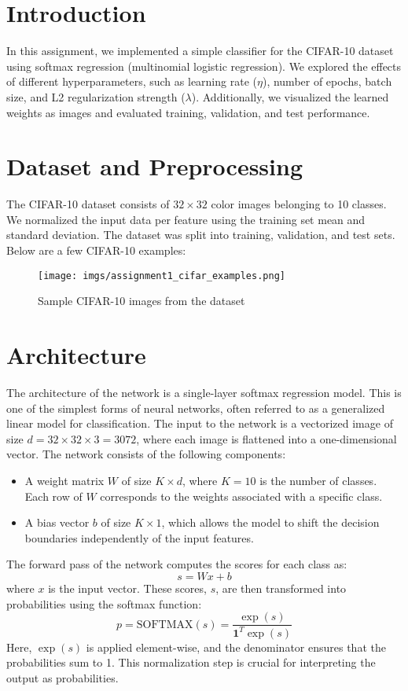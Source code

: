 \documentclass{article}
\begin{document}
\section{Introduction}
In this assignment, we implemented a simple classifier for the CIFAR-10 dataset using softmax regression (multinomial logistic regression). We explored the effects of different hyperparameters, such as learning rate ($\eta$), number of epochs, batch size, and L2 regularization strength ($\lambda$). Additionally, we visualized the learned weights as images and evaluated training, validation, and test performance.

\section{Dataset and Preprocessing}
The CIFAR-10 dataset consists of $32\times32$ color images belonging to 10 classes. We normalized the input data per feature using the training set mean and standard deviation. The dataset was split into training, validation, and test sets. Below are a few CIFAR-10 examples:

\begin{figure}[h!]
    \centering
    \texttt{[image: imgs/assignment1\_cifar\_examples.png]}
    \caption{Sample CIFAR-10 images from the dataset}
\end{figure}
\section{Architecture}
The architecture of the network is a single-layer softmax regression model. This is one of the simplest forms of neural networks, often referred to as a generalized linear model for classification. The input to the network is a vectorized image of size $d = 32 \times 32 \times 3 = 3072$, where each image is flattened into a one-dimensional vector. The network consists of the following components:

\begin{itemize}
    \item A weight matrix $W$ of size $K \times d$, where $K=10$ is the number of classes. Each row of $W$ corresponds to the weights associated with a specific class.
    \item A bias vector $b$ of size $K \times 1$, which allows the model to shift the decision boundaries independently of the input features.
\end{itemize}

The forward pass of the network computes the scores for each class as:
\[
s = W x + b
\]
where $x$ is the input vector. These scores, $s$, are then transformed into probabilities using the softmax function:
\[
p = \text{SOFTMAX}(s) = \frac{\exp(s)}{\mathbf{1}^T \exp(s)}
\]
Here, $\exp(s)$ is applied element-wise, and the denominator ensures that the probabilities sum to 1. This normalization step is crucial for interpreting the output as probabilities.
\end{document}
